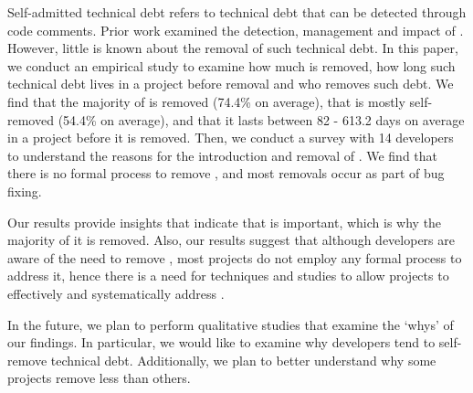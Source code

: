 Self-admitted technical debt refers to technical debt that can be detected through code comments. Prior work examined the detection, management and impact of \SATD. However, little is known about the removal of such technical debt. In this paper, we conduct an empirical study to examine how much \SATD is removed, how long such technical debt lives in a project before removal and who removes such debt. We find that the majority of \SATD is removed (74.4\% on average), that \SATD is mostly self-removed (54.4\% on average), and that it lasts between 82 - 613.2 days on average in a project before it is removed. Then, we conduct a survey with 14 developers to understand the reasons for the introduction and removal of \SATD. We find that there is no formal process to remove \SATD, and most removals occur as part of bug fixing.

Our results provide insights that indicate that \SATD is important, which is why the majority of it is removed. Also, our results suggest that although developers are aware of the need to remove \SATD, most projects do not employ any formal process to address it, hence there is a need for techniques and studies to allow projects to effectively and systematically address \SATD.

In the future, we plan to perform qualitative studies that examine the `whys' of our findings. In particular, we would like to examine why developers tend to self-remove technical debt. Additionally, we plan to better understand why some projects remove less \SATD than others.